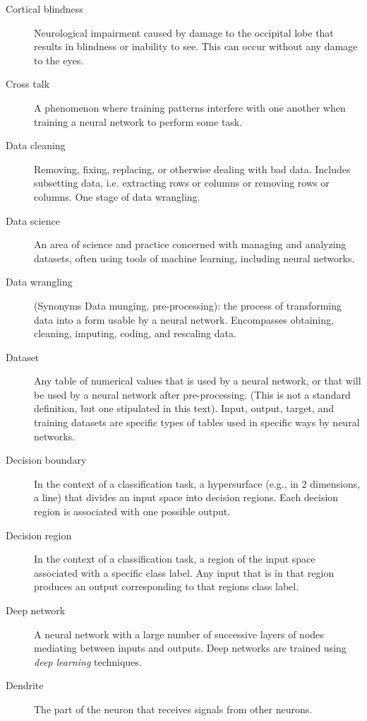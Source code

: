 \begin{description}
\item[Cortical blindness] Neurological impairment caused by damage to the occipital lobe that results in blindness or inability to see. This can occur without any damage to the eyes. 

\item[Cross talk] A phenomenon where training patterns interfere with one another when training a neural network to perform some task. 

\item[Data cleaning] Removing, fixing, replacing, or otherwise dealing with bad data. Includes subsetting data, i.e. extracting rows or columns or removing rows or columns. One stage of data wrangling.

\item[Data science]  An area of science and practice concerned with managing and analyzing datasets, often using tools of machine learning, including neural networks.

\item[Data wrangling] (Synonyms Data munging, pre-processing): the process of transforming data into a form usable by a neural network. Encompasses obtaining, cleaning, imputing, coding, and rescaling data. 

\item[Dataset] Any table of numerical values that is used by a neural network, or that will be used by a neural network after pre-processing. (This is not a standard definition, but one stipulated in this text). Input, output, target, and training datasets are specific types of tables used in specific ways by neural networks.

\item[Decision boundary] In the context of a classification task, a hypersurface (e.g., in 2 dimensions, a line) that divides an input space into decision regions. Each decision region is associated with one possible output.

\item[Decision region] In the context of a classification task, a region of the input space associated with a specific class label. Any input that is in that region produces an output corresponding to that regions class label.

\item[Deep network] A neural network with a large number of successive layers of nodes mediating between inputs and outputs. Deep networks are trained using \emph{deep learning} techniques.

\item[Dendrite] The part of the neuron that receives signals from other neurons.


\end{description}

